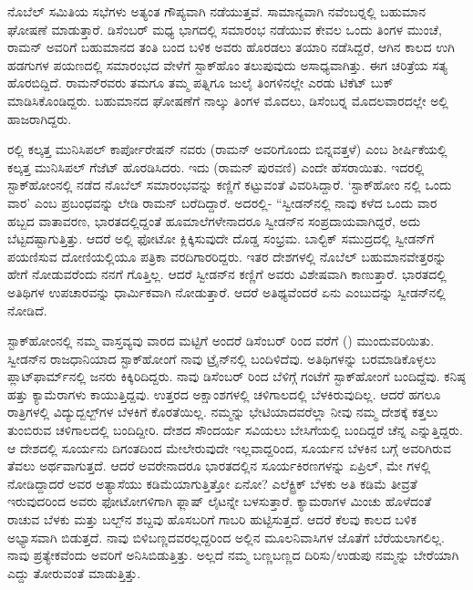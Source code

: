 ನೊಬೆಲ್ ಸಮಿತಿಯ ಸಭೆಗಳು ಅತ್ಯಂತ ಗೌಪ್ಯವಾಗಿ ನಡೆಯುತ್ತವೆ. ಸಾಮಾನ್ಯವಾಗಿ ನವೆಂಬರ್‍ನಲ್ಲಿ ಬಹುಮಾನ ಘೋಷಣೆ ಮಾಡುತ್ತಾರೆ. ಡಿಸೆಂಬರ್ ಮಧ್ಯ ಭಾಗದಲ್ಲಿ ಸಮಾರಂಭ ನಡೆಯುವ ಕೇವಲ ಒಂದು ತಿಂಗಳ ಮುಂಚೆ, ರಾಮನ್ ಅವರಿಗೆ ಬಹುಮಾನದ ತಂತಿ ಬಂದ ಬಳಿಕ ಅವರು ಹೊರಡಲು ತಯಾರಿ ನಡೆಸಿದ್ದರೆ, ಆಗಿನ ಕಾಲದ ಉಗಿ ಹಡಗುಗಳ ಪಯಣದಲ್ಲಿ ಸಮಾರಂಭದ ವೇಳೆಗೆ ಸ್ಟಾಕ್‍ಹೊಂ ತಲುಪುವುದು ಅಸಾಧ್ಯವಾಗಿತ್ತು. ಈಗ ಚರಿತ್ರೆಯ ಸತ್ಯ ಹೊರಬಿದ್ದಿದೆ. ರಾಮನ್‍ರವರು ತಮಗೂ ತಮ್ಮ ಪತ್ನಿಗೂ ಜುಲೈ ತಿಂಗಳಿನಲ್ಲೇ ಎರಡು ಟಿಕೆಟ್ ಬುಕ್ ಮಾಡಿಸಿಕೊಂಡಿದ್ದರು. ಬಹುಮಾನದ ಘೋಷಣೆಗೆ ನಾಲ್ಕು ತಿಂಗಳ ಮೊದಲು, ಡಿಸೆಂಬರ್‍ನ ಮೊದಲವಾರದಲ್ಲೇ ಅಲ್ಲಿ ಹಾಜರಾಗಿದ್ದರು.



ರಲ್ಲಿ ಕಲ್ಕತ್ತ ಮುನಿಸಿಪಲ್ ಕಾರ್ಪೋರೇಷನ್ ನವರು \textit{} (ರಾಮನ್ ಅವರಿಗೊಂದು ಬಿನ್ನವತ್ತಳೆ) ಎಂಬ ಶೀರ್ಷಿಕೆಯಲ್ಲಿ ಕಲ್ಕತ್ತ ಮುನಿಸಿಪಲ್ ಗೆಜೆಟ್ ಹೊರಡಿಸಿದರು. ಇದು  (ರಾಮನ್ ಪುರವಣಿ) ಎಂದೇ ಹೆಸರಾಯಿತು. ಇದರಲ್ಲಿ ಸ್ಟಾಕ್‍ಹೋಂನಲ್ಲಿ ನಡೆದ ನೊಬೆಲ್ ಸಮಾರಂಭವನ್ನು ಕಣ್ಣಿಗೆ ಕಟ್ಟುವಂತೆ ವಿವರಿಸಿದ್ದಾರೆ. ‘ಸ್ಟಾಕ್‍ಹೋಂ ನಲ್ಲಿ ಒಂದು ವಾರ’ ಎಂಬ ಪ್ರಬಂಧವನ್ನು ಲೇಡಿ ರಾಮನ್ ಬರೆದಿದ್ದಾರೆ. ಅದರಲ್ಲಿ- “ಸ್ವೀಡನ್‍ನಲ್ಲಿ ನಾವು ಕಳೆದ ಒಂದು ವಾರ ಹಬ್ಬದ ವಾತಾವರಣ, ಭಾರತದಲ್ಲಿದ್ದಂತೆ ಹೂಮಾಲೆಗಳೇನಾದರೂ ಸ್ವೀಡನ್‍ನ ಸಂಪ್ರದಾಯವಾಗಿದ್ದರೆ, ಅದು ಬೆಟ್ಟದಷ್ಟಾಗುತ್ತಿತ್ತು. ಆದರೆ ಅಲ್ಲಿ ಫೋಟೋ ಕ್ಲಿಕ್ಕಿಸುವುದೇ ದೊಡ್ಡ ಸಂಭ್ರಮ. ಬಾಲ್ಟಿಕ್ ಸಮುದ್ರದಲ್ಲಿ ಸ್ವೀಡನ್‍ಗೆ ಪಯಣಿಸುವ ದೋಣಿಯಲ್ಲಿಯೂ ಪತ್ರಿಕಾ ವರದಿಗಾರರಿದ್ದರು. ಇತರ ದೇಶಗಳಲ್ಲಿ ನೊಬೆಲ್ ಬಹುಮಾನವೇತ್ತರನ್ನು ಹೇಗೆ ನೋಡುವರೆಂದು ನನಗೆ ಗೊತ್ತಿಲ್ಲ. ಆದರೆ ಸ್ವೀಡನ್‍ನ ಕಣ್ಣಿಗೆ ಅವರು ವಿಶೇಷವಾಗಿ ಕಾಣುತ್ತಾರೆ. ಭಾರತದಲ್ಲಿ ಅತಿಥಿಗಳ ಉಪಚಾರವನ್ನು ಧಾರ್ಮಿಕವಾಗಿ ನೋಡುತ್ತಾರೆ. ಆದರೆ ಅತಿಥ್ಯವೆಂದರೆ ಏನು ಎಂಬುದನ್ನು ಸ್ವೀಡನ್‍ನಲ್ಲಿ ನೋಡಿದೆ.

ಸ್ಟಾಕ್‍ಹೋಂನಲ್ಲಿ ನಮ್ಮ ವಾಸ್ತವ್ಯವು ವಾರದ ಮಟ್ಟಿಗೆ ಅಂದರೆ ಡಿಸೆಂಬರ್  ರಿಂದ  ವರೆಗೆ () ಮುಂದುವರಿಯಿತು. ಸ್ವೀಡನ್‍ನ ರಾಜಧಾನಿಯಾದ ಸ್ಟಾಕ್‍ಹೋಂಗೆ ನಾವು ಟ್ರೈನ್‍ನಲ್ಲಿ ಬಂದಿಳಿದೆವು. ಅತಿಥಿಗಳನ್ನು ಬರಮಾಡಿಕೊಳ್ಳಲು ಪ್ಲಾಟ್‍ಫಾರ್ಮ್‌ನಲ್ಲಿ ಜನರು ಕಿಕ್ಕಿರಿದಿದ್ದರು. ನಾವು ಡಿಸೆಂಬರ್  ರಿಂದ ಬೆಳಿಗ್ಗೆ  ಗಂಟೆಗೆ ಸ್ಟಾಕ್‍ಹೋಂಗೆ ಬಂದಿದ್ದೆವು. ಕನಿಷ್ಠ ಹತ್ತು ಕ್ಯಾಮೆರಾಗಳು ಕಾಯುತ್ತಿದ್ದವು. ಉತ್ತರದ ಅಕ್ಷಾಂಶಗಳಲ್ಲಿ ಚಳಿಗಾಲದಲ್ಲಿ ಬೆಳಕಿರುವುದಿಲ್ಲ. ಆದರೆ ಹಗಲೂ ರಾತ್ರಿಗಳಲ್ಲಿ ವಿದ್ಯುದ್ಬಲ್ಬ್‌ಗಳ ಬೆಳಕಿಗೆ ಕೊರತೆಯಿಲ್ಲ. ನಮ್ಮನ್ನು ಭೇಟಿಯಾದವರೆಲ್ಲಾ ನೀವು ನಮ್ಮ ದೇಶಕ್ಕೆ ಕತ್ತಲು ತುಂಬಿರುವ ಚಳಿಗಾಲದಲ್ಲಿ ಬಂದಿದ್ದೀರಿ. ದೇಶದ ಸೌಂದರ್ಯ ಸವಿಯಲು ಬೇಸಿಗೆಯಲ್ಲಿ ಬಂದಿದ್ದರೆ ಚೆನ್ನ ಎನ್ನುತ್ತಿದ್ದರು. ಆ ದೇಶದಲ್ಲಿ ಸೂರ್ಯನು ದಿಗಂತದಿಂದ ಮೇಲೇರುವುದೇ ಇಲ್ಲವಾದ್ದರಿಂದ, ಸೂರ್ಯನ ಬೆಳಕಿನ ಬಗ್ಗೆ ಅವರಿಗಿರುವ ತೆವಲು ಅರ್ಥವಾಗುತ್ತದೆ. ಆದರೆ ಅವರೇನಾದರೂ ಭಾರತದಲ್ಲಿನ ಸೂರ್ಯಕಿರಣಗಳನ್ನು ಏಪ್ರಿಲ್, ಮೇ ಗಳಲ್ಲಿ ನೋಡಿದ್ದಾದರೆ ಅವರ ಅತ್ಯಾಸೆಯು ಕಡಿಮೆಯಾಗುತ್ತಿತ್ತೋ ಏನೋ? ಎಲೆಕ್ಟ್ರಿಕ್ ಬೆಳಕು ಅತಿ ಕಡಿಮೆ ತೀವ್ರತೆ ಇರುವುದರಿಂದ ಅವರು ಫೋಟೋಗಳಿಗಾಗಿ ಫ್ಲಾಷ್ ಲೈಟನ್ನೇ ಬಳಸುತ್ತಾರೆ. ಕ್ಯಾಮರಾಗಳ ಮಿಂಚು ಹೊಳೆದಂತೆ ರಾಚುವ ಬೆಳಕು ಮತ್ತು ಬಲ್ಬ್‌ನ ಶಬ್ದವು ಹೊಸಬರಿಗೆ ಗಾಬರಿ ಹುಟ್ಟಿಸುತ್ತದೆ. ಆದರೆ ಕೆಲವು ಕಾಲದ ಬಳಿಕ ಅಭ್ಯಾಸವಾಗಿ ಬಿಡುತ್ತದೆ. ನಾವು ಬಿಳಿಬಣ್ಣದವರಲ್ಲದ್ದರಿಂದ ಅಲ್ಲಿನ ಮೂಲನಿವಾಸಿಗಳ ಜೊತೆಗೆ ಬೆರೆಯಲಾಗಲಿಲ್ಲ. ನಾವು ಪ್ರತ್ಯೇಕವೆಂದು ಅವರಿಗೆ ಅನಿಸಿಬಿಡುತ್ತಿತ್ತು. ಅಲ್ಲದೆ ನಮ್ಮ ಬಣ್ಣಬಣ್ಣದ ದಿರಿಸು/ಉಡುಪು ನಮ್ಮನ್ನು ಬೇರೆಯಾಗಿ ಎದ್ದು ತೋರುವಂತೆ ಮಾಡುತ್ತಿತ್ತು.

